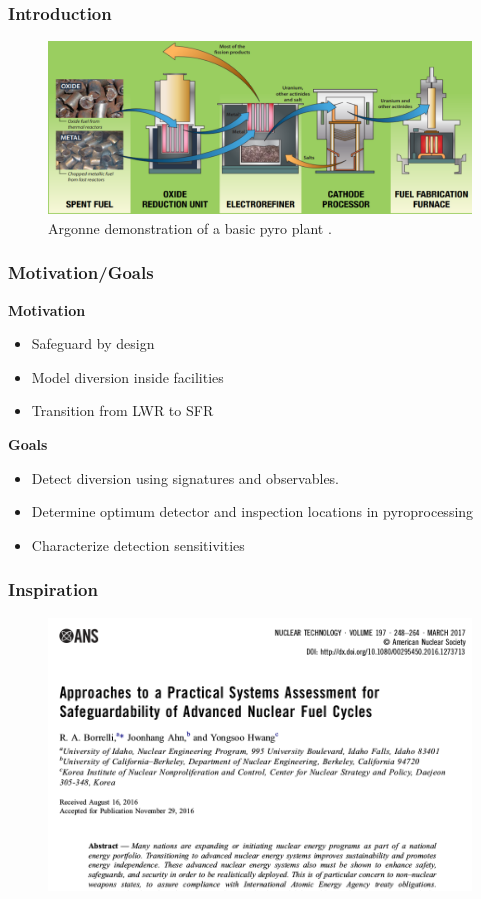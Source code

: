 \begin{frame}
\frametitle{Introduction}
	\begin{figure}
		\centering
		\includegraphics[width=\linewidth]{pyro-background.png}
		\caption{Argonne demonstration of a basic pyro plant \cite{williamson_pyroprocessing_nodate}.}
		\label{fig:pyro}
	\end{figure}
\end{frame}

\begin{frame}
\frametitle{Motivation/Goals}
\textbf{Motivation}
\begin{itemize}
	\item Safeguard by design
	\item Model diversion inside facilities
	\item Transition from LWR to SFR
\end{itemize}
\textbf{Goals}
\begin{itemize}
	\item Detect diversion using signatures and observables.
	\item Determine optimum detector and inspection locations in pyroprocessing
	\item Characterize detection sensitivities
\end{itemize}
\end{frame}


\begin{frame}
\frametitle{Inspiration}
\begin{figure}
\centering
\includegraphics[width=0.9\linewidth]{borrelli-citation.png}
\end{figure}
\end{frame}